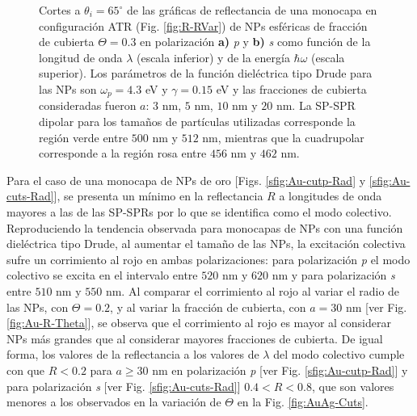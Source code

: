 \begin{figure}[h!]
	\caption{Cortes a $\theta_i = 65^\circ$ de las gráficas de reflectancia de una monocapa en configuración ATR (Fig. \ref{fig:R-RVar}) de NPs esféricas de fracción de cubierta $\Theta = 0.3$ en polarización \textbf{a)} \emph{p} y \textbf{b)} \emph{s} como función de la longitud de onda $\lambda$ (escala inferior) y de la energía $\hbar\omega$ (escala superior). Los parámetros de la función dieléctrica tipo Drude para las NPs son $\omega_p = 4.3$ eV y $\gamma = 0.15$ eV y las fracciones de cubierta consideradas fueron $a$: $3$ nm, $5$ nm, $10$ nm y $20$ nm. La SP-SPR dipolar para los tamaños de partículas utilizadas corresponde la región verde entre $500$ nm y $512$ nm, mientras que la cuadrupolar corresponde a la región rosa entre $456$ nm y $462$ nm.}\label{fig:AuAg-Cuts-Rad}
	\end{figure}	

Para el caso de una monocapa de NPs de oro [Figs. \ref{sfig:Au-cutp-Rad} y \ref{sfig:Au-cuts-Rad}], se presenta un mínimo en la reflectancia $R$ a longitudes de onda mayores a las de las SP-SPRs por lo que se identifica como el modo colectivo. Reproduciendo la tendencia observada para monocapas de NPs con una función dieléctrica tipo Drude, al aumentar el tamaño de las NPs, la excitación colectiva sufre un corrimiento al rojo en ambas polarizaciones: para polarización \emph{p} el modo colectivo se excita en el intervalo entre $520$ nm y $620$ nm y para polarización \emph{s} entre $510$ nm y $550$ nm. Al comparar el corrimiento al rojo al variar el radio de las NPs, con $\Theta=0.2$, y al variar la fracción de cubierta, con $a=30$ nm [ver Fig. \ref{fig:Au-R-Theta}], se observa que el corrimiento al rojo es mayor al considerar NPs más grandes que al considerar mayores fracciones de cubierta. De igual forma, los valores de la reflectancia a los valores de $\lambda$ del modo colectivo cumple con que  $R<0.2$ para $a\geq 30$ nm en polarización \emph{p} [ver Fig. \ref{sfig:Au-cutp-Rad}] y  para polarización \emph{s}  [ver Fig. \ref{sfig:Au-cuts-Rad}] $0.4<R<0.8$, que son valores menores a los observados en la variación de $\Theta$ en la Fig. \ref{fig:AuAg-Cuts}.

